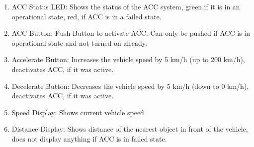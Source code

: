 \begin{enumerate}
  \item ACC Status LED: Shows the status of the ACC system, green if it is in an operational state, red, if ACC  is in a failed state.
  \item ACC Button: Push Button to activate ACC. Can only be pushed if ACC is in operational state and not turned on already.
  \item Accelerate Button: Increases the vehicle speed by 5 km/h (up to 200 km/h), deactivates ACC, if it was active.
  \item Decelerate Button: Decreases the vehicle speed by 5 km/h (down to 0 km/h), deactivates ACC, if it was active.
  \item Speed Display: Shows current vehicle speed
  \item Distance Display: Shows distance of the nearest object in front of the vehicle, does not display anything if ACC is in failed state.
\end{enumerate}
